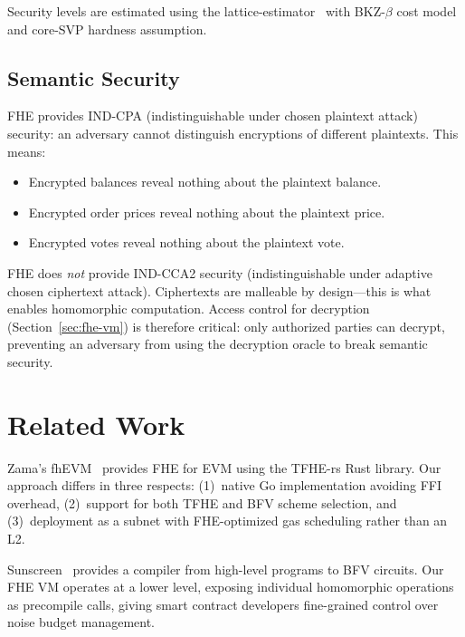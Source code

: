 \documentclass[11pt,a4paper]{article}
\begin{document}
Security levels are estimated using the lattice-estimator~\cite{albrecht2015lattice}
with BKZ-$\beta$ cost model and core-SVP hardness assumption.

\subsection{Semantic Security}

FHE provides IND-CPA (indistinguishable under chosen plaintext attack) security:
an adversary cannot distinguish encryptions of different plaintexts. This means:

\begin{itemize}[leftmargin=2em]
  \item Encrypted balances reveal nothing about the plaintext balance.
  \item Encrypted order prices reveal nothing about the plaintext price.
  \item Encrypted votes reveal nothing about the plaintext vote.
\end{itemize}

FHE does \emph{not} provide IND-CCA2 security (indistinguishable under adaptive
chosen ciphertext attack). Ciphertexts are malleable by design---this is what
enables homomorphic computation. Access control for decryption (Section~\ref{sec:fhe-vm})
is therefore critical: only authorized parties can decrypt, preventing an adversary
from using the decryption oracle to break semantic security.

\section{Related Work}
\label{sec:related}

Zama's fhEVM~\cite{zama2023fhevm} provides FHE for EVM using the TFHE-rs Rust
library. Our approach differs in three respects: (1)~native Go implementation
avoiding FFI overhead, (2)~support for both TFHE and BFV scheme selection, and
(3)~deployment as a subnet with FHE-optimized gas scheduling rather than an L2.

Sunscreen~\cite{sunscreen2023} provides a compiler from high-level programs to BFV
circuits. Our FHE VM operates at a lower level, exposing individual homomorphic
operations as precompile calls, giving smart contract developers fine-grained control
over noise budget management.
\end{document}
